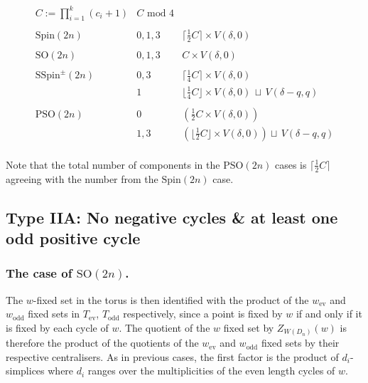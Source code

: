 \documentclass[11pt,a4paper]{article}
\def\SSpin{\mathrm{SSpin}}
\def\Spin{\mathrm{Spin}}
\def\SO{\mathrm{SO}}
\def\PSO{\mathrm{PSO}}
\def\SSpin{\mathrm{SSpin}}
\def\ev{\mathrm{ev}}
\def\odd{\mathrm{odd}}
\begin{document}
\bigskip

\begin{table}[h]
\[
\begin{array}{c|c|c}
 C:=\prod_{i=1}^k (c_i+1) & C\text{ mod } 4 & \\
  &&\\
\hline
\Spin(2n)   & 0,1,3 & \lceil\frac 12 C\rceil \times V(\delta,0)  \\
&&\\
 \SO(2n)   & 0,1,3 & C \times V(\delta,0)\\
 &&\\
\SSpin^\pm(2n)   & 0,3 &  \lceil\frac 14 C\rceil \times V(\delta,0)\\
   & 1 & \lfloor\frac 14 C\rfloor \times V(\delta,0) \,\sqcup \,V(\delta-q,q)\\
  &&\\
\PSO(2n)   & 0 &  \left(\frac 12 C \times V(\delta,0)\right)\\
   & 1,3 &\left(\lfloor \frac 12 C\rfloor \times V(\delta,0) \right) \sqcup \,V(\delta-q,q)\\
\end{array}
\]

\bigskip

\caption{The structure of the $D_n$ sector associated to a conjugacy class which has negative cycles and odd positive cycles}

\end{table}

Note that the total number of components in the $\PSO(2n)$ cases is $\lceil \frac 12C\rceil$ agreeing with the number from the $\Spin(2n)$ case.

\bigskip


\subsection{Type IIA: No negative cycles \& at least one odd positive cycle}

\subsubsection{The case of $\SO(2n)$.}\label{no negs at least one odd pos}

The $w$-fixed set in the torus is then identified with the product of the $w_{\ev}$  and $w_{\odd}$ fixed sets in $T_{\ev}$, $T_{\odd}$ respectively, since a point is fixed by $w$ if and only if it is fixed by each cycle of $w$. The quotient of the $w$ fixed set by $Z_{W(D_n)}(w)$ is therefore the product of the quotients of the $w_{\ev}$ and $w_{\odd}$ fixed sets by their respective centralisers.  As in previous cases, the first factor is the product of $d_i$-simplices where $d_i$ ranges over the multiplicities of the even length cycles of $w$.
\end{document}
